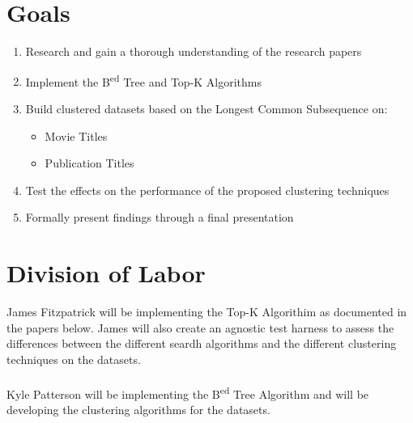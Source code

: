 \documentclass[pdftex,12pt,letter]{article}
\begin{document}
\section{Goals}
\begin{enumerate}
\item Research and gain a thorough understanding of the research papers
\item Implement the B\textsuperscript{ed} Tree and Top-K Algorithms
\item Build clustered datasets based on the Longest Common Subsequence on:
\begin{itemize}
\item Movie Titles
\item Publication Titles
\end{itemize}
\item Test the effects on the performance of the proposed clustering techniques 
\item Formally present findings through a final presentation
\end{enumerate}


\section{Division of Labor}
James Fitzpatrick will be implementing the Top-K  Algorithim as documented in the papers below. James will also create an agnostic test harness to assess the differences between the different seardh algorithms and the different clustering techniques on the datasets. 
\\\\
Kyle Patterson will be implementing the B\textsuperscript{ed} Tree Algorithm and will be developing the clustering algorithms for the datasets. 
\end{document}
